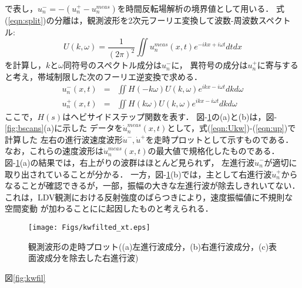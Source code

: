 で表し，$u_n^-=-(u_n^+-u_n^{meas})$を時間反転場解析の境界値として用いる．
式(\ref{eqn:split})の分離は，観測波形を2次元フーリエ変換して波数-周波数スペクトル:
\begin{equation}
	U(k,\omega)= \frac{1}{(2\pi)^2} \iint u^{meas}_n(x,t)e^{-ikx+i\omega t}dtdx
	\label{eqn:Ukw}
\end{equation}
を計算し，$k$と$\omega$同符号のスペクトル成分は$u_n^-$に，
異符号の成分は$u_n^+$に寄与すると考え，帯域制限した次のフーリエ逆変換で求める．
\begin{eqnarray}
	u_n^-(x,t) &=& \iint H(-k\omega)U(k,\omega)e^{ikx-i\omega t}dk d\omega
	\label{eqn:um} \\
	u_n^+(x,t) &=& \iint H(k\omega) U(k,\omega)e^{ikx-i\omega t}dk d\omega 
	\label{eqn:up}
\end{eqnarray}
ここで，$H(s)$はヘビサイドステップ関数を表す．
{\rm 図}-\ref{fig:kwfilted_xt}の(a)と(b)は，{\rm 図}-\ref{fig:bscans}(a)に示した
データを$\dot u_n^{meas}(x,t)$として，式(\ref{eqn:Ukw})-(\ref{eqn:up})で計算した
左右の進行波速度波形$\dot{u}^-,\dot{u}^+$を走時プロットとして示すものである．
なお，これらの速度波形は$\dot u_n^{meas}(x,t)$の最大値で規格化したものである．
{\rm 図-}\ref{fig:kwfilted_xt}(a)の結果では，右上がりの波群はほとんど見られず，
左進行波$\dot u_n^-$が適切に取り出されていることが分かる．
一方，{\rm 図}-\ref{fig:kwfilted_xt}(b)では，主として右進行波$\dot u_n^{+}$から
なることが確認できるが，一部，振幅の大きな左進行波が除去しきれいてない．
これは，LDV観測における反射強度のばらつきにより，速度振幅値に不規則な空間変動
が加わることにに起因したものと考えられる．
\begin{figure}[htb]
\centering
	\texttt{[image: Figs/kwfilted\_xt.eps]}
	\caption{観測波形の走時プロット((a)左進行波成分，(b)右進行波成分，(c)表面波成分を除去した右進行波)}
	\label{fig:kwfilted_xt}
\end{figure}
図\ref{fig:kwfil}
